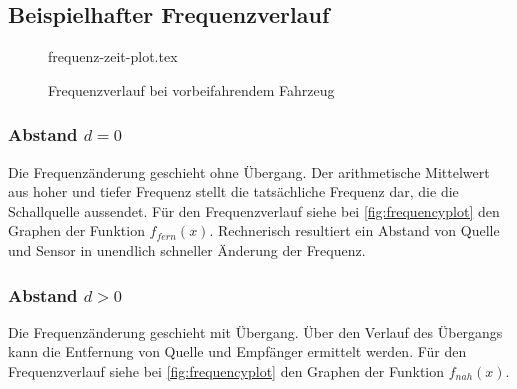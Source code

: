 \documentclass[12pt, a4paper]{article}
\begin{document}
\FloatBarrier
\subsection{Beispielhafter Frequenzverlauf}

\begin{figure}[htbp]
    \centering
    {frequenz-zeit-plot.tex}
    \caption{Frequenzverlauf bei vorbeifahrendem Fahrzeug}
    \label{fig:frequencyplot}
\end{figure}

\subsubsection*{Abstand \(d = 0\)}
Die Frequenzänderung geschieht ohne Übergang. Der arithmetische Mittelwert aus
hoher und tiefer Frequenz stellt die tatsächliche Frequenz dar, die die
Schallquelle aussendet. Für den Frequenzverlauf siehe bei
\autoref{fig:frequencyplot} den Graphen der Funktion \(f_{fern}(x)\).
Rechnerisch resultiert ein Abstand von Quelle und Sensor in unendlich schneller
Änderung der Frequenz.

\subsubsection*{Abstand \(d > 0\)}
Die Frequenzänderung geschieht mit Übergang. Über den Verlauf des Übergangs kann
die Entfernung von Quelle und Empfänger ermittelt werden. Für den Frequenzverlauf
siehe bei \autoref{fig:frequencyplot} den Graphen der Funktion \(f_{nah}(x)\).
\end{document}
